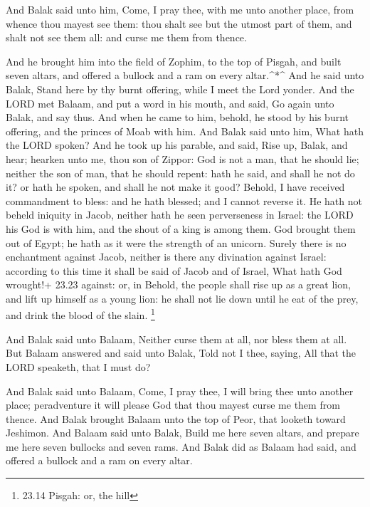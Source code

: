  And Balak said unto him, Come, I pray thee, with me unto
another place, from whence thou mayest see them: thou shalt see but the
utmost part of them, and shalt not see them all: and curse me them from
thence.

 And he brought him into the field of Zophim, to the top of
Pisgah, and built seven altars, and offered a bullock and a ram on every
altar.\^{}*\^{}  And he said unto Balak, Stand here by thy
burnt offering, while I meet the Lord yonder.  And the LORD
met Balaam, and put a word in his mouth, and said, Go again unto Balak,
and say thus.  And when he came to him, behold, he stood by
his burnt offering, and the princes of Moab with him. And Balak said
unto him, What hath the LORD spoken?  And he took up his
parable, and said, Rise up, Balak, and hear; hearken unto me, thou son
of Zippor:  God is not a man, that he should lie; neither
the son of man, that he should repent: hath he said, and shall he not do
it? or hath he spoken, and shall he not make it good? 
Behold, I have received commandment to bless: and he hath blessed; and I
cannot reverse it.  He hath not beheld iniquity in Jacob,
neither hath he seen perverseness in Israel: the LORD his God is with
him, and the shout of a king is among them.  God brought
them out of Egypt; he hath as it were the strength of an unicorn.
 Surely there is no enchantment against Jacob, neither is
there any divination against Israel: according to this time it shall be
said of Jacob and of Israel, What hath God wrought!+ 23.23 against: or,
in  Behold, the people shall rise up as a great lion, and
lift up himself as a young lion: he shall not lie down until he eat of
the prey, and drink the blood of the slain. \footnote{23.14 Pisgah: or,
  the hill}

 And Balak said unto Balaam, Neither curse them at all, nor
bless them at all.  But Balaam answered and said unto
Balak, Told not I thee, saying, All that the LORD speaketh, that I must
do?

 And Balak said unto Balaam, Come, I pray thee, I will
bring thee unto another place; peradventure it will please God that thou
mayest curse me them from thence.  And Balak brought Balaam
unto the top of Peor, that looketh toward Jeshimon.  And
Balaam said unto Balak, Build me here seven altars, and prepare me here
seven bullocks and seven rams.  And Balak did as Balaam had
said, and offered a bullock and a ram on every altar.

